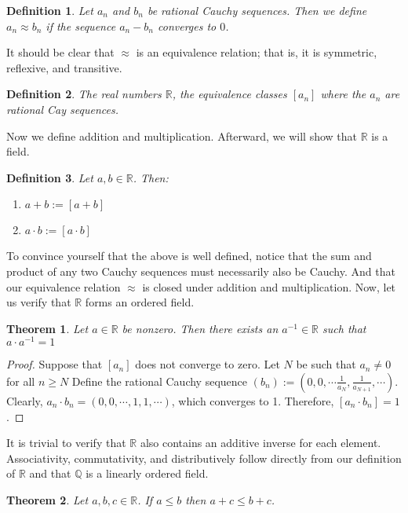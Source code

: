 \documentclass{article}
\newtheorem{thm}{Theorem}[section]
\newtheorem{defn}{Definition}[section]
\numberwithin{equation}{section}
\begin{document}
    \begin{defn}
        Let $a_n$ and $b_n$ be rational Cauchy sequences. Then we define $a_n \approx b_n$ if the sequence $a_n-b_n$ converges to $0$.
    \end{defn}
    It should be clear that $\approx$ is an equivalence relation; that is,
    it is symmetric, reflexive, and transitive.
    \begin{defn}
        The real numbers $\mathbb{R}$, the equivalence classes $[a_n]$ where the $a_n$ are rational Cay sequences.
    \end{defn}
    Now we define addition and multiplication. Afterward, we will show that $\mathbb{R}$ is a field.
    \begin{defn}
        Let $a,b \in \mathbb{R}$. Then:
        \begin{enumerate}
            \item $a+b:=[a+b]$
            \item $a\cdot b:=[a \cdot b]$
        \end{enumerate}
        \end{defn}
        To convince yourself that the above is well defined, notice that 
        the sum and product of any two Cauchy sequences must necessarily also be Cauchy. And that our equivalence relation $\approx$
        is closed under addition and multiplication. Now, let us verify that $\mathbb{R}$ forms an ordered field.
        \begin{thm}
            Let $a \in \mathbb{R}$ be nonzero. Then there exists an $a^{-1} \in \mathbb{R}$ such that $a \cdot a^{-1}=1$
        \end{thm}
        \begin{proof}
            Suppose that $[a_n]$ does not converge to zero. Let $N$ be such that $a_n\neq 0$ for all $n\geq N$
            Define the rational Cauchy sequence $(b_n):=(0, 0, \cdots \frac{1}{a_N}, \frac{1}{a_{N+1}}, \cdots)$. Clearly, $a_n \cdot b_n=(0, 0, \cdots, 1, 1, \cdots)$, which converges to 1. Therefore, $[a_n \cdot b_n]=1$.
        \end{proof}
        It is trivial to verify that $\mathbb{R}$ also contains an additive inverse for each element.
        Associativity, commutativity, and distributively follow directly from our definition of $\mathbb{R}$ and that $\mathbb{Q}$ is a linearly ordered field.
        \begin{thm}
            Let $a,b,c \in \mathbb{R}$. If $a \leq b$ then $a+c \leq b+c$.
        \end{thm} 
\end{document}
